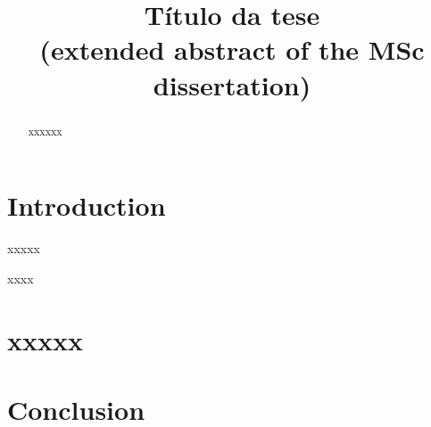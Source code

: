 \documentclass[conference]{IEEEtran}
\begin{document}
\title{Título da tese\\ \vspace{3mm} \normalsize (extended abstract of the MSc dissertation)}


\author{
}


\maketitle


\thispagestyle{plain}
\pagestyle{plain}


\begin{abstract}
xxxxxx
\end{abstract}


\section{Introduction}

xxxxx \cite{shuttle}

xxxx



\section{xxxxx}



\section{Conclusion}








 

\end{document}
